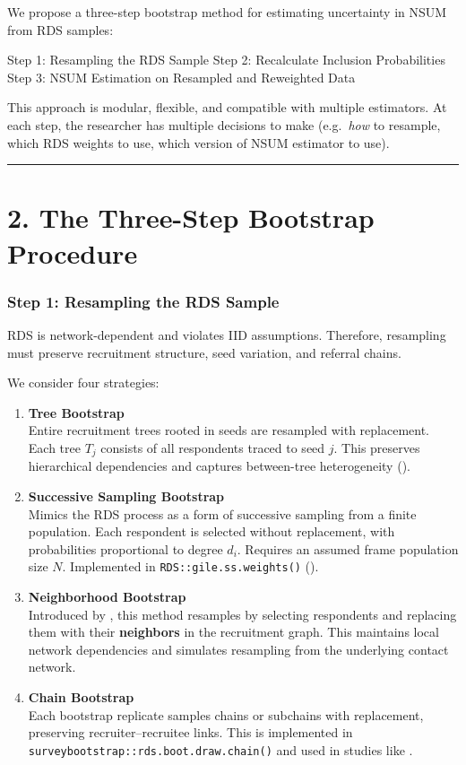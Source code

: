\documentclass[
  12pt,
  letterpaper,
  DIV=11,
  numbers=noendperiod]{scrartcl}
\theoremstyle{plain}
\theoremstyle{definition}
\begin{document}
We propose a three-step bootstrap method for estimating uncertainty in
NSUM from RDS samples:

Step 1: Resampling the RDS Sample Step 2: Recalculate Inclusion
Probabilities Step 3: NSUM Estimation on Resampled and Reweighted Data

This approach is modular, flexible, and compatible with multiple
estimators. At each step, the researcher has multiple decisions to make
(e.g.~\emph{how} to resample, which RDS weights to use, which version of
NSUM estimator to use).

\begin{center}\rule{0.5\linewidth}{0.5pt}\end{center}

\section{2. The Three-Step Bootstrap
Procedure}\label{the-three-step-bootstrap-procedure}

\subsubsection{Step 1: Resampling the RDS
Sample}\label{step-1-resampling-the-rds-sample-1}

RDS is network-dependent and violates IID assumptions. Therefore,
resampling must preserve recruitment structure, seed variation, and
referral chains.

We consider four strategies:

\begin{enumerate}
\def\labelenumi{\arabic{enumi}.}
\item
  \textbf{Tree Bootstrap}\\
  Entire recruitment trees rooted in seeds are resampled with
  replacement. Each tree \(T_j\) consists of all respondents traced to
  seed \(j\). This preserves hierarchical dependencies and captures
  between-tree heterogeneity (\textcite{salg06-variance}).
\item
  \textbf{Successive Sampling Bootstrap}\\
  Mimics the RDS process as a form of successive sampling from a finite
  population. Each respondent is selected without replacement, with
  probabilities proportional to degree \(d_i\). Requires an assumed
  frame population size \(N\). Implemented in
  \texttt{RDS::gile.ss.weights()} (\textcite{gile11-inference}).
\item
  \textbf{Neighborhood Bootstrap}\\
  Introduced by \textcite{yauc22-neighboot}, this method resamples by
  selecting respondents and replacing them with their \textbf{neighbors}
  in the recruitment graph. This maintains local network dependencies
  and simulates resampling from the underlying contact network.
\item
  \textbf{Chain Bootstrap}\\
  Each bootstrap replicate samples chains or subchains with replacement,
  preserving recruiter--recruitee links. This is implemented in
  \texttt{surveybootstrap::rds.boot.draw.chain()} and used in studies
  like \textcite{weir12-comparison}.
\end{enumerate}
\end{document}
